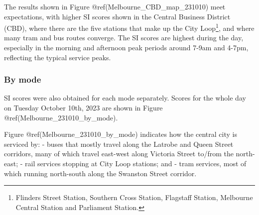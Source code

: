 \documentclass[preprint, 3p,
authoryear]{elsarticle} %
\begin{document}
The results shown in Figure @ref(Melbourne\_CBD\_map\_231010) meet
expectations, with higher SI scores shown in the Central Business
District (CBD), where there are the five stations that make up the City
Loop\footnote{Flinders Street Station, Southern Cross Station, Flagstaff
  Station, Melbourne Central Station and Parliament Station.}, and where
many tram and bus routes converge. The SI scores are highest during the
day, especially in the morning and afternoon peak periods around 7-9am
and 4-7pm, reflecting the typical service peaks.

\hypertarget{by-mode}{%
\subsubsection{By mode}\label{by-mode}}

SI scores were also obtained for each mode separately. Scores for the
whole day on Tuesday October 10th, 2023 are shown in Figure
@ref(Melbourne\_231010\_by\_mode).

Figure @ref(Melbourne\_231010\_by\_mode) indicates how the central city
is serviced by: - buses that mostly travel along the Latrobe and Queen
Street corridors, many of which travel east-west along Victoria Street
to/from the north-east; - rail services stopping at City Loop stations;
and - tram services, most of which running north-south along the
Swanston Street corridor.
\end{document}
